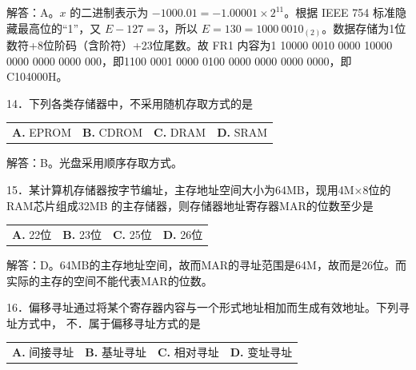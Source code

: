 \documentclass[UTF8,11pt]{ctexart}
\begin{document}
解答：A。\(\displaystyle x\) 的二进制表示为 \(\displaystyle -1000.01=-1.00001\times2^{11}\)。根据 IEEE 754 标准隐藏最高位的“1”，又 \(\displaystyle E-127=3\)，所以 \(\displaystyle E=130=1000\ 0010_{(2)}\)。数据存储为1位数符+8位阶码（含阶符）+23位尾数。故 FR1 内容为1 10000 0010 0000 10000 0000 0000 0000 000，即1100 0001 0000 0100 0000 0000 0000 0000，即C104000H。


14．下列各类存储器中，不采用随机存取方式的是


\begin{center}\begin{tabular}{>{\raggedright\arraybackslash}p{\dimexpr(\linewidth-8\tabcolsep)/4\relax}>{\raggedright\arraybackslash}p{\dimexpr(\linewidth-8\tabcolsep)/4\relax}>{\raggedright\arraybackslash}p{\dimexpr(\linewidth-8\tabcolsep)/4\relax}>{\raggedright\arraybackslash}p{\dimexpr(\linewidth-8\tabcolsep)/4\relax}}
\textbf{A.} EPROM & \textbf{B.} CDROM & \textbf{C.} DRAM & \textbf{D.} SRAM\\[.35em]\end{tabular}\end{center}

解答：B。光盘采用顺序存取方式。


15．某计算机存储器按字节编址，主存地址空间大小为64MB，现用4M×8位的RAM芯片组成32MB 的主存储器，则存储器地址寄存器MAR的位数至少是


\begin{center}\begin{tabular}{>{\raggedright\arraybackslash}p{\dimexpr(\linewidth-8\tabcolsep)/4\relax}>{\raggedright\arraybackslash}p{\dimexpr(\linewidth-8\tabcolsep)/4\relax}>{\raggedright\arraybackslash}p{\dimexpr(\linewidth-8\tabcolsep)/4\relax}>{\raggedright\arraybackslash}p{\dimexpr(\linewidth-8\tabcolsep)/4\relax}}
\textbf{A.} 22位 & \textbf{B.} 23位 & \textbf{C.} 25位 & \textbf{D.} 26位\\[.35em]\end{tabular}\end{center}

解答：D。64MB的主存地址空间，故而MAR的寻址范围是64M，故而是26位。而实际的主存的空间不能代表MAR的位数。


16．偏移寻址通过将某个寄存器内容与一个形式地址相加而生成有效地址。下列寻址方式中， 不．属于偏移寻址方式的是


\begin{center}\begin{tabular}{>{\raggedright\arraybackslash}p{\dimexpr(\linewidth-8\tabcolsep)/4\relax}>{\raggedright\arraybackslash}p{\dimexpr(\linewidth-8\tabcolsep)/4\relax}>{\raggedright\arraybackslash}p{\dimexpr(\linewidth-8\tabcolsep)/4\relax}>{\raggedright\arraybackslash}p{\dimexpr(\linewidth-8\tabcolsep)/4\relax}}
\textbf{A.} 间接寻址 & \textbf{B.} 基址寻址 & \textbf{C.} 相对寻址 & \textbf{D.} 变址寻址\\[.35em]\end{tabular}\end{center}
\end{document}
